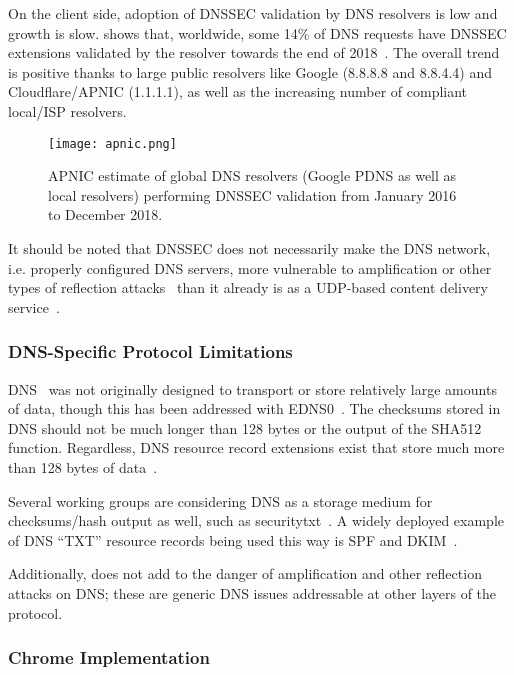 On the client side, adoption of DNSSEC validation by DNS resolvers is low and
growth is slow.  shows that, worldwide, some 14\% of DNS requests
have DNSSEC extensions validated by the resolver towards the end of
2018~\cite{APNIC}. The overall trend is positive thanks to large public
resolvers like Google (8.8.8.8 and 8.8.4.4) and Cloudflare/APNIC (1.1.1.1), as
well as the increasing number of compliant local/ISP resolvers.

\begin{figure}[t]
    \centering
    \texttt{[image: apnic.png]}
    \caption{APNIC estimate of global DNS resolvers (Google PDNS as well as
    local resolvers) performing DNSSEC validation from January 2016 to December
    2018.}\label{fig:apnic}
\end{figure}

It should be noted that DNSSEC does not necessarily make the DNS network, i.e.
properly configured DNS servers, more vulnerable to amplification or other types
of reflection attacks~\cite{Ariya} than it already is as a UDP-based content
delivery service~\cite{USCERT, Vixie}.

\subsubsection{DNS-Specific Protocol Limitations}

DNS~\cite{DNS1} was not originally designed to transport or store relatively
large amounts of data, though this has been addressed with EDNS0~\cite{EDNS}.
The checksums stored in DNS should not be much longer than 128 bytes or the
output of the SHA512 function. Regardless, DNS resource record extensions exist
that store much more than 128 bytes of data~\cite{CERT, IPSECKEY, DANE3, DANE1}.

Several working groups are considering DNS as a storage medium for
checksums/hash output as well, such as securitytxt~\cite{draft-sectxt}. A widely
deployed example of DNS ``TXT'' resource records being used this way is SPF and
DKIM~\cite{DKIM}.

Additionally, \SYSTEM{} does not add to the danger of amplification and other
reflection attacks on DNS; these are generic DNS issues addressable at other
layers of the protocol.

\subsubsection{Chrome Implementation}

